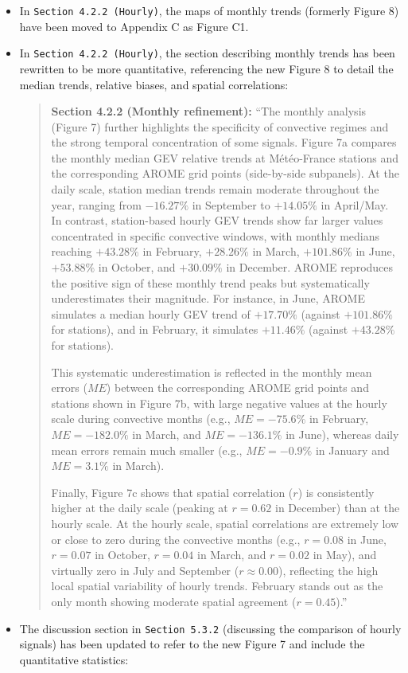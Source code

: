 \documentclass[
  letterpaper,
  DIV=11,
  numbers=noendperiod]{scrartcl}
\begin{document}
\begin{itemize}
\item
  In \texttt{Section\ 4.2.2\ (Hourly)}, the maps of monthly trends
  (formerly Figure 8) have been moved to Appendix C as Figure C1.
\item
  In \texttt{Section\ 4.2.2\ (Hourly)}, the section describing monthly
  trends has been rewritten to be more quantitative, referencing the new
  Figure 8 to detail the median trends, relative biases, and spatial
  correlations:

  \begin{quote}
  \textbf{Section 4.2.2 (Monthly refinement):} ``The monthly analysis
  (Figure 7) further highlights the specificity of convective regimes
  and the strong temporal concentration of some signals. Figure 7a
  compares the monthly median GEV relative trends at Météo-France
  stations and the corresponding AROME grid points (side-by-side
  subpanels). At the daily scale, station median trends remain moderate
  throughout the year, ranging from \(-16.27\%\) in September to
  \(+14.05\%\) in April/May. In contrast, station-based hourly GEV
  trends show far larger values concentrated in specific convective
  windows, with monthly medians reaching \(+43.28\%\) in February,
  \(+28.26\%\) in March, \(+101.86\%\) in June, \(+53.88\%\) in October,
  and \(+30.09\%\) in December. AROME reproduces the positive sign of
  these monthly trend peaks but systematically underestimates their
  magnitude. For instance, in June, AROME simulates a median hourly GEV
  trend of \(+17.70\%\) (against \(+101.86\%\) for stations), and in
  February, it simulates \(+11.46\%\) (against \(+43.28\%\) for
  stations).

  This systematic underestimation is reflected in the monthly mean
  errors (\(ME\)) between the corresponding AROME grid points and
  stations shown in Figure 7b, with large negative values at the hourly
  scale during convective months (e.g., \(ME = -75.6\%\) in February,
  \(ME = -182.0\%\) in March, and \(ME = -136.1\%\) in June), whereas
  daily mean errors remain much smaller (e.g., \(ME = -0.9\%\) in
  January and \(ME = 3.1\%\) in March).

  Finally, Figure 7c shows that spatial correlation (\(r\)) is
  consistently higher at the daily scale (peaking at \(r = 0.62\) in
  December) than at the hourly scale. At the hourly scale, spatial
  correlations are extremely low or close to zero during the convective
  months (e.g., \(r = 0.08\) in June, \(r = 0.07\) in October,
  \(r = 0.04\) in March, and \(r = 0.02\) in May), and virtually zero in
  July and September (\(r \approx 0.00\)), reflecting the high local
  spatial variability of hourly trends. February stands out as the only
  month showing moderate spatial agreement (\(r = 0.45\)).''
  \end{quote}
\item
  The discussion section in \texttt{Section\ 5.3.2} (discussing the
  comparison of hourly signals) has been updated to refer to the new
  Figure 7 and include the quantitative statistics:


\end{itemize}
\end{document}
